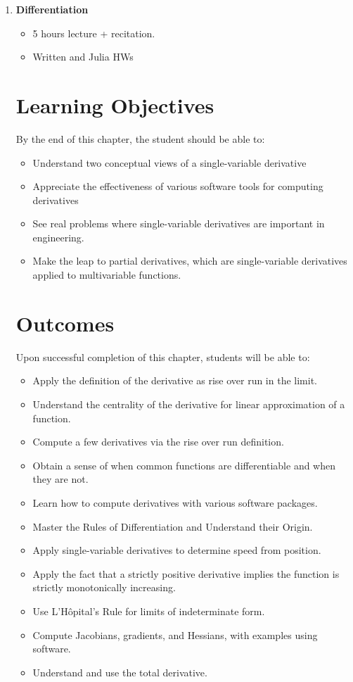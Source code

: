 \documentclass[letterpaper]{book}
\begin{document}
\begin{enumerate}[label={\large\arabic*}, font=\large]
\bigskip

\item {\Large \bf Differentiation}
\begin{itemize}
    \item 5 hours lecture + recitation.
    \item Written and Julia HWs
\end{itemize}

\section*{Learning Objectives}
By the end of this chapter, the student should be able to:
\begin{itemize}
\item Understand two conceptual views of a single-variable derivative
\item Appreciate the effectiveness of various software tools for computing derivatives
\item See real problems where single-variable derivatives are important in engineering.
\item Make the leap to partial derivatives, which are single-variable derivatives applied to multivariable functions.
\end{itemize}

\section*{Outcomes}
Upon successful completion of this chapter, students will be able to:
\begin{itemize}
 \item Apply the definition of the derivative as rise over run in the limit.
 \item Understand the centrality of the derivative for linear approximation of a function.
 \item Compute a few derivatives via the rise over run definition.
 \item Obtain a sense of when common functions are differentiable and when they are not.
 \item Learn how to compute derivatives with various software packages.
 \item Master the Rules of Differentiation and Understand their Origin.
  \item Apply single-variable derivatives to determine speed from position.
  \item Apply the fact that a strictly positive derivative implies the function is strictly monotonically increasing.
 \item Use L'H\^opital's Rule for limits of indeterminate form.
  \item Compute Jacobians, gradients, and Hessians, with examples using software. 
\item Understand and use the total derivative.
 \end{itemize}



\end{enumerate}
\end{document}
